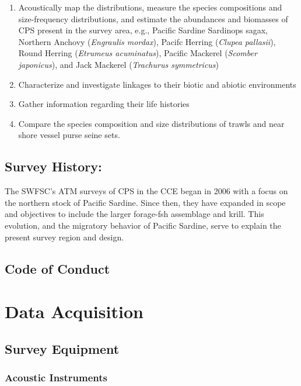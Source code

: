 \documentclass[
  letterpaper,
  oneside,
  open=any]{scrbook}
\providecommand{\tightlist}{%
  \setlength{\itemsep}{0pt}\setlength{\parskip}{0pt}}\usepackage{longtable,booktabs,array}
\begin{document}
\begin{enumerate}
\def\labelenumi{\arabic{enumi}.}
\tightlist
\item
  Acoustically map the distributions, measure the species compositions
  and size-frequency distributions, and estimate the abundances and
  biomasses of CPS present in the survey area, e.g., Pacific Sardine
  Sardinops sagax, Northern Anchovy (\emph{Engraulis mordax}), Pacifc
  Herring (\emph{Clupea pallasii}), Round Herring (\emph{Etrumeus
  acuminatus}), Pacific Mackerel (\emph{Scomber japonicus}), and Jack
  Mackerel (\emph{Trachurus symmetricus})
\item
  Characterize and investigate linkages to their biotic and abiotic
  environments
\item
  Gather information regarding their life histories
\item
  Compare the species composition and size distributions of trawls and
  near shore vessel purse seine sets.
\end{enumerate}

\section{Survey History:}\label{survey-history}

The SWFSC's ATM surveys of CPS in the CCE began in 2006 with a focus on
the northern stock of Pacific Sardine. Since then, they have expanded in
scope and objectives to include the larger forage-fsh assemblage and
krill. This evolution, and the migratory behavior of Pacific Sardine,
serve to explain the present survey region and design.

\section{Code of Conduct}\label{code-of-conduct}


\chapter{Data Acquisition}\label{data-acquisition}

\section{Survey Equipment}\label{survey-equipment}

\subsection{Acoustic Instruments}\label{acoustic-instruments}
\end{document}
